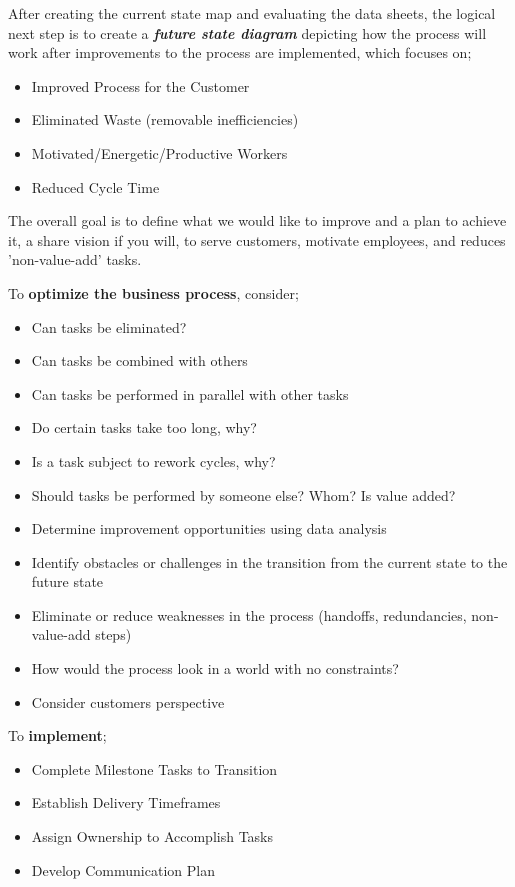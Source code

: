 \documentclass{article}
\begin{document}
\newpage

After creating the current state map and evaluating the data sheets, the logical next step is to create a \textbf{\textit{future state diagram}} depicting how the process will work after improvements to the process are implemented, which focuses on; \begin{itemize}
    \item Improved Process for the Customer
    \item Eliminated Waste (removable inefficiencies)
    \item Motivated/Energetic/Productive Workers
    \item Reduced Cycle Time
\end{itemize}

The overall goal is to define what we would like to improve and a plan to achieve it, a share vision if you will, to serve customers, motivate employees, and reduces 'non-value-add' tasks. 

\hspace{-0.67cm} To \textbf{optimize the business process}, consider; \begin{itemize}
    \item Can tasks be eliminated?
    \item Can tasks be combined with others
    \item Can tasks be performed in parallel with other tasks
    \item Do certain tasks take too long, why?
    \item Is a task subject to rework cycles, why?
    \item Should tasks be performed by someone else? Whom? Is value added?
    \item Determine improvement opportunities using data analysis
    \item Identify obstacles or challenges in the transition from the current state to the future state
    \item Eliminate or reduce weaknesses in the process (handoffs, redundancies, non-value-add steps)
    \item How would the process look in a world with no constraints?
    \item Consider customers perspective
\end{itemize}

\hspace{-0.67cm} To \textbf{implement}; \begin{itemize}
    \item Complete Milestone Tasks to Transition
    \item Establish Delivery Timeframes
    \item Assign Ownership to Accomplish Tasks
    \item Develop Communication Plan
\end{itemize} 
\end{document}
